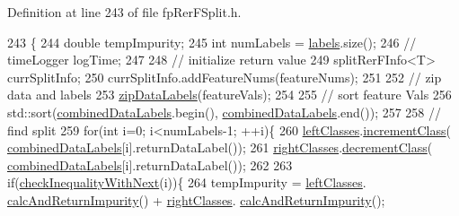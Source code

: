 Definition at line 243 of file fp\+Rer\+F\+Split.\+h.


\begin{DoxyCode}
243                                                                                                            
         \{
244                     \textcolor{keywordtype}{double} tempImpurity;
245                     \textcolor{keywordtype}{int} numLabels = \hyperlink{classfp_1_1splitRerF_a85d708ae07bbfae5205111082e4037df}{labels}.size();
246                     \textcolor{comment}{//  timeLogger logTime;}
247 
248                     \textcolor{comment}{// initialize return value}
249                     splitRerFInfo<T> currSplitInfo;
250                     currSplitInfo.addFeatureNums(featureNums);
251 
252                     \textcolor{comment}{// zip data and labels}
253                     \hyperlink{classfp_1_1splitRerF_a46321fe50cebbf12238e4e1be1928e0d}{zipDataLabels}(featureVals);
254 
255                     \textcolor{comment}{// sort feature Vals}
256                     std::sort(\hyperlink{classfp_1_1splitRerF_a2ce4d0a7ae4ba4958ddcc1adba71b2c9}{combinedDataLabels}.begin(), 
      \hyperlink{classfp_1_1splitRerF_a2ce4d0a7ae4ba4958ddcc1adba71b2c9}{combinedDataLabels}.end());
257 
258                     \textcolor{comment}{// find split}
259                     \textcolor{keywordflow}{for}(\textcolor{keywordtype}{int} i=0; i<numLabels-1; ++i)\{
260                         \hyperlink{classfp_1_1splitRerF_aa5aa4856a4bc8e5f0852d8e6fa935cfc}{leftClasses}.\hyperlink{classfp_1_1classRerFTotals_a1be2afa6bf6490104eac4c283abe62ef}{incrementClass}(
      \hyperlink{classfp_1_1splitRerF_a2ce4d0a7ae4ba4958ddcc1adba71b2c9}{combinedDataLabels}[i].returnDataLabel());
261                         \hyperlink{classfp_1_1splitRerF_a8f78d6a0269d046328bead1cbf51be36}{rightClasses}.\hyperlink{classfp_1_1classRerFTotals_aac0c0d5bc058592a51d1fceeaf38a8fd}{decrementClass}(
      \hyperlink{classfp_1_1splitRerF_a2ce4d0a7ae4ba4958ddcc1adba71b2c9}{combinedDataLabels}[i].returnDataLabel());
262 
263                         \textcolor{keywordflow}{if}(\hyperlink{classfp_1_1splitRerF_aee3b2a4912c569eeb5c2aea155ab48ab}{checkInequalityWithNext}(i))\{
264                             tempImpurity = \hyperlink{classfp_1_1splitRerF_aa5aa4856a4bc8e5f0852d8e6fa935cfc}{leftClasses}.
      \hyperlink{classfp_1_1classRerFTotals_acb145c7c137fecc8766b9616f80daff2}{calcAndReturnImpurity}() + \hyperlink{classfp_1_1splitRerF_a8f78d6a0269d046328bead1cbf51be36}{rightClasses}.
      \hyperlink{classfp_1_1classRerFTotals_acb145c7c137fecc8766b9616f80daff2}{calcAndReturnImpurity}();

\end{DoxyCode}

